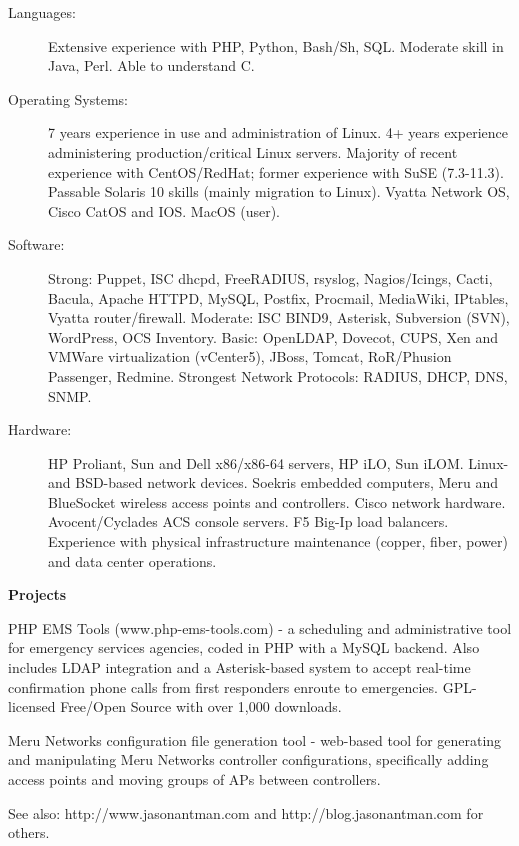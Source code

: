 \documentclass[letterpaper,11pt]{article}
\newcommand{\resheading}[1]{{\large \colorbox{mygrey}{\begin{minipage}{\textwidth}{\textbf{#1 \vphantom{p\^{E}}}}\end{minipage}}}}
\begin{document}
\begin{description}
\item[Languages:]
Extensive experience with PHP, Python, Bash/Sh, SQL. Moderate skill in Java, Perl. Able to understand C.
\item[Operating Systems:]
7 years experience in use and administration of Linux. 4+ years experience administering production/critical Linux servers.
Majority of recent experience with CentOS/RedHat; former experience with SuSE
(7.3-11.3). Passable Solaris 10 skills (mainly migration to Linux). Vyatta Network OS, Cisco CatOS and IOS. MacOS (user).
\item[Software:]
Strong: Puppet, ISC dhcpd, FreeRADIUS, rsyslog, Nagios/Icings, Cacti, Bacula, Apache HTTPD, MySQL, Postfix, Procmail, MediaWiki, IPtables, Vyatta router/firewall. Moderate: ISC BIND9, Asterisk, Subversion (SVN), WordPress, OCS Inventory. Basic: OpenLDAP, Dovecot, CUPS, Xen and VMWare virtualization (vCenter5), JBoss, Tomcat, RoR/Phusion Passenger, Redmine. Strongest Network Protocols: RADIUS, DHCP, DNS, SNMP.


\item[Hardware:]
HP Proliant, Sun and Dell x86/x86-64 servers, HP iLO, Sun iLOM. Linux- and
BSD-based network devices. Soekris embedded computers, Meru and BlueSocket
wireless access points and controllers. Cisco network hardware. Avocent/Cyclades ACS console servers. F5 Big-Ip load balancers. Experience with physical infrastructure maintenance (copper, fiber, power) and data center operations.
\end{description}


\resheading{Projects}

\begin{description}
\item[2007--Present:] PHP EMS Tools (www.php-ems-tools.com) - a scheduling and
  administrative tool for emergency services agencies, coded in PHP with a MySQL
  backend. Also includes LDAP integration and a Asterisk-based system to accept
  real-time confirmation phone calls from first responders enroute to
  emergencies. GPL-licensed Free/Open Source with over 1,000 downloads.
\item[In Progress] Meru Networks configuration file generation tool - web-based tool
  for generating and manipulating Meru Networks controller configurations, specifically
  adding access points and moving groups of APs between controllers.
\item See also: http://www.jasonantman.com and http://blog.jasonantman.com for others.

\end{description}
\end{document}
